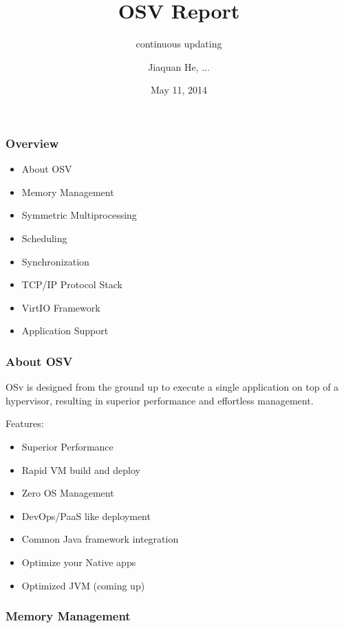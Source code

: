 \documentclass[10pt]{beamer}
\title{OSV Report}
\subtitle{continuous updating}
\author[Jiaquan He, ...]{Jiaquan He, ...}
\institute[THCSOS]{
	THCSOS
}
\date{May 11, 2014}
\begin{document}
\begin{frame}[plain]
	\titlepage
\end{frame}


\begin{frame}
	\frametitle{Overview}

\begin{itemize}
	\item About OSV
	\item Memory Management
	\item Symmetric Multiprocessing
	\item Scheduling
	\item Synchronization
	\item TCP/IP Protocol Stack
	\item VirtIO Framework
	\item Application Support
\end{itemize}

\end{frame}


\begin{frame}
	\frametitle{About OSV}

	OSv is designed from the ground up to execute a single application on top of a hypervisor, resulting in superior performance and effortless management.

	\bigskip
	\pause

	Features: 
	\begin{itemize}
		\item Superior Performance
		\item Rapid VM build and deploy
		\item Zero OS Management
		\item DevOps/PaaS like deployment
		\item Common Java framework integration
		\item Optimize your Native apps
		\item Optimized JVM (coming up)
	\end{itemize}

\end{frame}


\begin{frame}
	\frametitle{Memory Management}
  
\end{frame}
\end{document}
